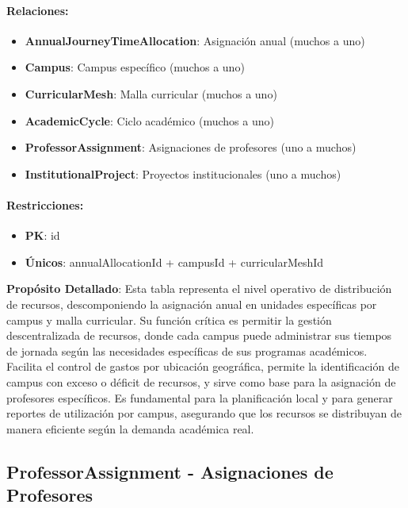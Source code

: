 \documentclass[11pt,a4paper]{article}
\begin{document}
\paragraph{Relaciones:}
\begin{itemize}
    \item \textbf{AnnualJourneyTimeAllocation}: Asignación anual (muchos a uno)
    \item \textbf{Campus}: Campus específico (muchos a uno)
    \item \textbf{CurricularMesh}: Malla curricular (muchos a uno)
    \item \textbf{AcademicCycle}: Ciclo académico (muchos a uno)
    \item \textbf{ProfessorAssignment}: Asignaciones de profesores (uno a muchos)
    \item \textbf{InstitutionalProject}: Proyectos institucionales (uno a muchos)
\end{itemize}

\paragraph{Restricciones:}
\begin{itemize}
    \item \textbf{PK}: id
    \item \textbf{Únicos}: annualAllocationId + campusId + curricularMeshId
\end{itemize}

\vspace{0.5cm}

\textbf{Propósito Detallado}: Esta tabla representa el nivel operativo de distribución de recursos, descomponiendo la asignación anual en unidades específicas por campus y malla curricular. Su función crítica es permitir la gestión descentralizada de recursos, donde cada campus puede administrar sus tiempos de jornada según las necesidades específicas de sus programas académicos. Facilita el control de gastos por ubicación geográfica, permite la identificación de campus con exceso o déficit de recursos, y sirve como base para la asignación de profesores específicos. Es fundamental para la planificación local y para generar reportes de utilización por campus, asegurando que los recursos se distribuyan de manera eficiente según la demanda académica real.

{\color{darkblue}\Large\subsection{ProfessorAssignment - Asignaciones de Profesores}}
\end{document}
